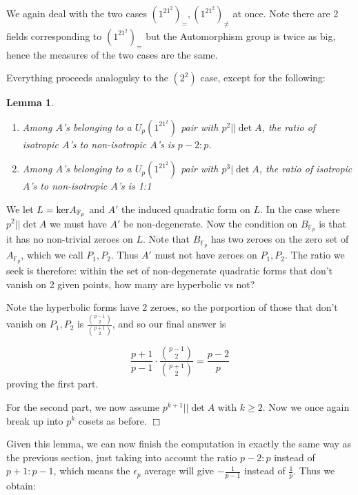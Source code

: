 \documentclass{article}
\def\binom#1#2{{#1\choose#2}}
\def\ker{{\rm ker}}
\def\F{{\mathbb F}}
\def\F{{\mathbb F}}
\newtheorem{lemma}[theorem]{Lemma}
\newenvironment{proof}{\noindent {\bf Proof:}}{$\Box$ \vspace{2 ex}}
\begin{document}
We again deal with the two cases $(1^21^2)_=,(1^21^2)_{\neq}$ at once. Note there are 2 fields corresponding to $(1^21^2)_=$ but the Automorphism group is twice as big, hence the measures of the two cases are the same. 

Everything proceeds analogulsy to the $(2^2)$ case, except for the following:


\begin{lemma}\label{lem:type1^21^2isotropy}
\begin{enumerate}
    \item Among $A$'s belonging to a $U_p(1^21^2)$ pair with $p^2 || \det A$, the ratio of isotropic $A$'s to non-isotropic $A$'s is $p-2 : p$.
    \item Among $A$'s belonging to a $U_p(1^21^2)$ pair with $p^3 | \det A$, the ratio of isotropic $A$'s to non-isotropic $A$'s is 1:1
\end{enumerate} 
\end{lemma}

\begin{proof}
    We let $L=\ker A_{\F_p}$ and $A'$ the induced quadratic form on $L$. 
    In the case where $p^2 || \det A$ we must have $A'$ be non-degenerate. 
    Now the condition on $B_{\F_p}$ is that it has no non-trivial zeroes on $L$. 
    Note that $B_{\F_p}$ has two zeroes on the zero set of $A_{\F_p}$, which we call $P_1,P_2$. Thus $A'$ must not have zeroes on $P_1,P_2$. The ratio we seek is therefore: within the set of non-degenerate quadratic forms that don't vanish on 2 given points, how many are hyperbolic vs not?

    Note the hyperbolic forms have 2 zeroes, so the porportion of those that don't vanish on $P_1,P_2$ is $\frac{\binom{p-1}{2}}{\binom{p+1}{2}}$, and so our final answer is 

    $$\frac{p+1}{p-1}\cdot \frac{\binom{p-1}{2}}{\binom{p+1}{2}} = \frac{p-2}p$$ proving the first part.

    For the second part, we now assume $p^{k+1}|| \det A$ with $k\geq 2$. Now we once again break up into $p^k$ cosets as before.
\end{proof}

Given this lemma, we can now finish the computation in exactly the same way as the previous section, just taking into account the ratio $p-2:p$ instead of $p+1:p-1$, which means the $\epsilon_p$ average will give $-\frac{1}{p-1}$ instead of $\frac{1}{p}$. Thus we obtain:
\end{document}
